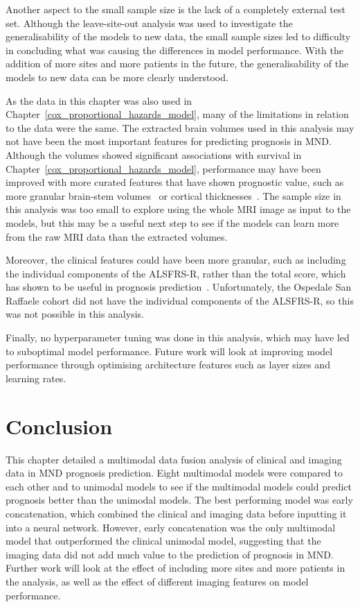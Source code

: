 Another aspect to the small sample size is the lack of a completely external test set.
Although the leave-site-out analysis was used to investigate the generalisability of the models to new data, the small sample sizes led to difficulty in concluding what was causing the differences in model performance.
With the addition of more sites and more patients in the future, the generalisability of the models to new data can be more clearly understood.

As the data in this chapter was also used in Chapter~\ref{cox_proportional_hazards_model}, many of the limitations in relation to the data were the same.
The extracted brain volumes used in this analysis may not have been the most important features for predicting prognosis in MND.
Although the volumes showed significant associations with survival in Chapter~\ref{cox_proportional_hazards_model}, performance may have been improved with more curated features that have shown prognostic value, such as more granular brain-stem volumes~\cite{milellaMedullaOblongataVolume2022} or cortical thicknesses~\cite{burghMultimodalLongitudinalStudy2020,dieckmannCorticalSubcorticalGrey2022}.
The sample size in this analysis was too small to explore using the whole MRI image as input to the models, but this may be a useful next step to see if the models can learn more from the raw MRI data than the extracted volumes.

Moreover, the clinical features could have been more granular, such as including the individual components of the ALSFRS-R, rather than the total score, which has shown to be useful in prognosis prediction~\cite{hothornRandomForest4LifeRandomForest2014}.
Unfortunately, the Ospedale San Raffaele cohort did not have the individual components of the ALSFRS-R, so this was not possible in this analysis.

Finally, no hyperparameter tuning was done in this analysis, which may have led to suboptimal model performance.
Future work will look at improving model performance through optimising architecture features such as layer sizes and learning rates.

\section{Conclusion}

This chapter detailed a multimodal data fusion analysis of clinical and imaging data in MND prognosis prediction.
Eight multimodal models were compared to each other and to unimodal models to see if the multimodal models could predict prognosis better than the unimodal models.
The best performing model was early concatenation, which combined the clinical and imaging data before inputting it into a neural network.
However, early concatenation was the only multimodal model that outperformed the clinical unimodal model, suggesting that the imaging data did not add much value to the prediction of prognosis in MND.
Further work will look at the effect of including more sites and more patients in the analysis, as well as the effect of different imaging features on model performance.
